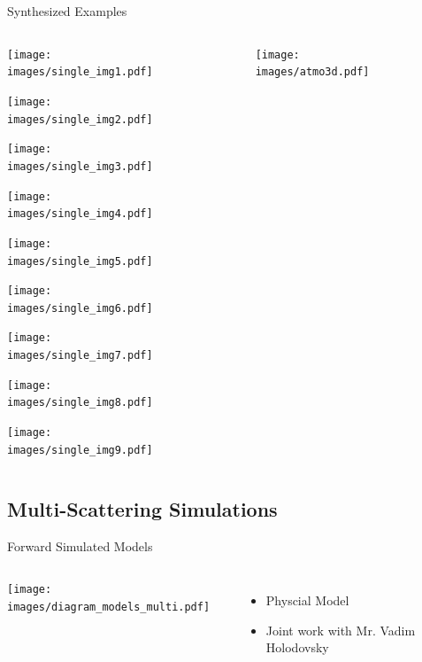 \documentclass[compress,red,12pt]{beamer}
\begin{document}

\begin{frame}{Synthesized Examples}
  \begin{columns}[C]
    \begin{column}{.7\textwidth}
      \begin{overlayarea}{\columnwidth}{8cm}
        {\centerline{\texttt{[image: images/single\_img1.pdf]}}}
        {\centerline{\texttt{[image: images/single\_img2.pdf]}}}
        {\centerline{\texttt{[image: images/single\_img3.pdf]}}}
        {\centerline{\texttt{[image: images/single\_img4.pdf]}}}
        {\centerline{\texttt{[image: images/single\_img5.pdf]}}}
        {\centerline{\texttt{[image: images/single\_img6.pdf]}}}
        {\centerline{\texttt{[image: images/single\_img7.pdf]}}}
        {\centerline{\texttt{[image: images/single\_img8.pdf]}}}
        {\centerline{\texttt{[image: images/single\_img9.pdf]}}}
      \end{overlayarea}
    \end{column}
    \begin{column}{.3\textwidth}
      \begin{figure}
        \centering
        \texttt{[image: images/atmo3d.pdf]}
      \end{figure}
    \end{column}
  \end{columns}
\end{frame}


\subsection{Multi-Scattering Simulations}

\begin{frame}{Forward Simulated Models}
  \begin{columns}[C]
    \texttt{[image: images/diagram\_models\_multi.pdf]}

    \begin{itemize}
    \item Physcial Model
    \item Joint work with Mr. Vadim Holodovsky
    \end{itemize}
  \end{columns}
\end{frame}
\end{document}
